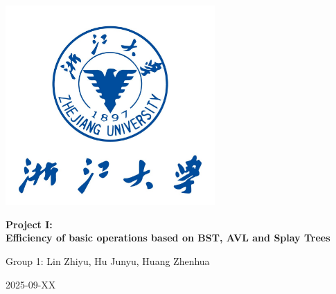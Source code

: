 \thispagestyle{empty}
\begin{titlepage}
  \centering
  \vspace*{1.5cm}
  \includegraphics[width=0.6\textwidth]{images/cover.png}\par
  \vspace{2cm}
  {\Huge\bfseries Project I:\\[0.5em]Efficiency of basic operations based on BST, AVL and Splay Trees\par}
  \vspace{1.5cm}
  {\Large Group 1: Lin Zhiyu, Hu Junyu, Huang Zhenhua\par}
  \vfill
  {\large 2025-09-XX\par}
\end{titlepage}
\clearpage
{}